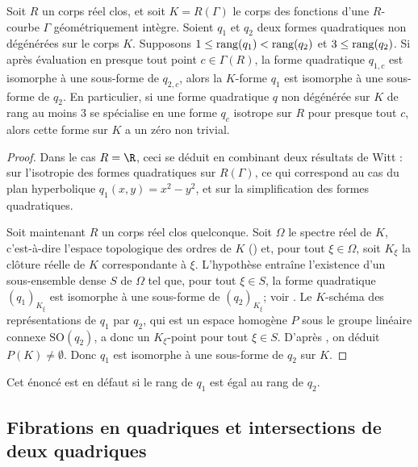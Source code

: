 
\begin{thm}\label{wittgen}
Soit $R$ un corps réel clos, et soit $K=R(\Gamma)$ le corps des fonctions d'une $R$-courbe
$\Gamma$ géométriquement intègre. Soient $q_{1}$ et $q_{2}$ deux formes quadratiques non dégénérées
sur le corps $K$. Supposons $1 \leq {\rm rang}(q_{1}) < {\rm rang}(q_{2})$ et $3 \leq {\rm rang}(q_{2})$.
Si après évaluation en presque tout point $c \in \Gamma(R)$, la forme quadratique
$q_{1,c}$ est isomorphe à une sous-forme de $q_{2,c}$, alors la $K$-forme $q_{1}$
est isomorphe à une sous-forme de $q_{2}$. En particulier, si une forme quadratique $q$
non dégénérée sur $K$ de rang au moins $3$ se spécialise en une forme $q_{c}$
isotrope sur $R$ pour presque tout $c$, alors cette forme sur $K$ a un zéro non trivial.
\end{thm}

\begin{proof}
Dans le cas $R=\R$, ceci se déduit en combinant deux résultats de Witt :
\cite[Satz 22]{witt1937theorie} sur l'isotropie des formes quadratiques sur $R(\Gamma)$, ce qui correspond au cas du plan hyperbolique $q_{1}(x,y)=x^2-y^2$, et \cite[Satz 4]{witt1937theorie} sur la simplification des formes quadratiques.

Soit maintenant $R$ un corps réel clos quelconque. Soit $\Omega$ le spectre réel de $K$, c'est-à-dire l'espace topologique des ordres de $K$ (\cf \cite[(0.4.1)]{scheiderer1994real}) et, pour tout $\xi\in \Omega$, soit $K_\xi$ la clôture réelle de $K$ correspondante à $\xi$. L'hypothèse entraîne l'existence d'un sous-ensemble dense $S$ de $\Omega$ tel que, pour tout $\xi\in S$, la forme quadratique $(q_1)_{K_\xi}$ est isomorphe à une sous-forme de $(q_2)_{K_\xi}$; voir \cite[p.\,308]{scheiderer1996hasse}. Le $K$-schéma des représentations
de $q_{1}$ par $q_{2}$, qui est un espace homogène $P$ sous le groupe linéaire
connexe $\mathrm{SO}(q_{2})$, a donc un $K_\xi$-point pour tout $\xi\in S$. D'après \cite[Cor.\,6.2]{scheiderer1996hasse}, on déduit $P(K)\neq \emptyset$. Donc $q_1$ est isomorphe à une sous-forme de $q_2$ sur $K$.
\end{proof}

\begin{rmk}
Cet énoncé est en défaut si le rang de $q_{1}$ est égal au rang de $q_{2}$.
\end{rmk}

\subsection{Fibrations en quadriques et intersections de deux quadriques}

